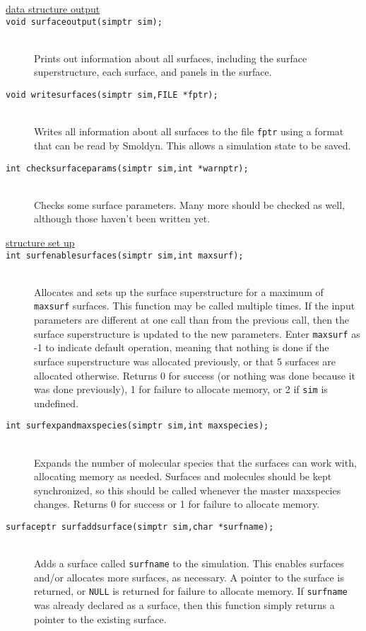 \documentclass {scrbook}
\newcommand {\ttt} {\texttt}
\begin{document}
\begin{description}
\item[\underline{data structure output}]

\item[\ttt{void surfaceoutput(simptr sim);}]
\hfill \\
Prints out information about all surfaces, including the surface superstructure, each surface, and panels in the surface.

\item[\ttt{void writesurfaces(simptr sim,FILE *fptr);}]
\hfill \\
Writes all information about all surfaces to the file \ttt{fptr} using a format that can be read by Smoldyn. This allows a simulation state to be saved.

\item[\ttt{int checksurfaceparams(simptr sim,int *warnptr);}]
\hfill \\
Checks some surface parameters. Many more should be checked as well, although those haven't been written yet.

\item[\underline{structure set up}]

\item[\ttt{int surfenablesurfaces(simptr sim,int maxsurf);}]
\hfill \\
Allocates and sets up the surface superstructure for a maximum of \ttt{maxsurf} surfaces. This function may be called multiple times. If the input parameters are different at one call than from the previous call, then the surface superstructure is updated to the new parameters. Enter \ttt{maxsurf} as -1 to indicate default operation, meaning that nothing is done if the surface superstructure was allocated previously, or that 5 surfaces are allocated otherwise. Returns 0 for success (or nothing was done because it was done previously), 1 for failure to allocate memory, or 2 if \ttt{sim} is undefined.

\item[\ttt{int surfexpandmaxspecies(simptr sim,int maxspecies);}]
\hfill \\
Expands the number of molecular species that the surfaces can work with, allocating memory as needed. Surfaces and molecules should be kept synchronized, so this should be called whenever the master maxspecies changes. Returns 0 for success or 1 for failure to allocate memory.

\item[\ttt{surfaceptr surfaddsurface(simptr sim,char *surfname);}]
\hfill \\
Adds a surface called \ttt{surfname} to the simulation. This enables surfaces and/or allocates more surfaces, as necessary. A pointer to the surface is returned, or \ttt{NULL} is returned for failure to allocate memory. If \ttt{surfname} was already declared as a surface, then this function simply returns a pointer to the existing surface.


\end{description}
\end{document}
